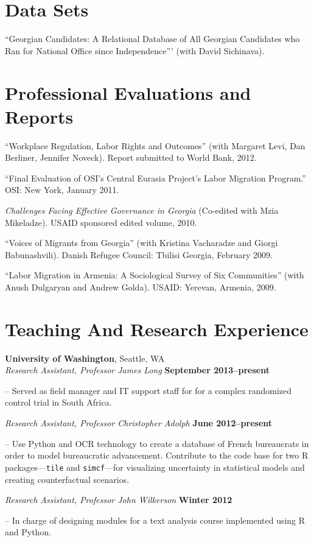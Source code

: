 \documentclass[margin,line]{res}
\newenvironment{list1}{
  \begin{list}{\ding{113}}{%
      \setlength{\itemsep}{0in}
      \setlength{\parsep}{0in} \setlength{\parskip}{0in}
      \setlength{\topsep}{0in} \setlength{\partopsep}{0in} 
      \setlength{\leftmargin}{0.17in}}}{\end{list}}
\begin{document}
{\begin{resume}
\section{\sc Data Sets}
``Georgian Candidates: A Relational Database of All Georgian
Candidates who Ran for National Office since Independence''' (with
David Sichinava).

\section{\sc Professional Evaluations and Reports}

 ``Workplace Regulation, Labor Rights and Outcomes'' (with Margaret Levi, Dan Berliner, Jennifer Noveck). Report submitted to World Bank,  2012. 

``Final Evaluation of OSI's Central Eurasia Project's Labor Migration
Program.'' OSI: New York, January 2011. 

\emph{Challenges Facing Effective Governance in Georgia} (Co-edited with Mzia Mikeladze). USAID sponsored edited volume, 2010.  

``Voices of Migrants
from Georgia''  (with Kristina Vacharadze and Giorgi Babunashvili).
Danish Refugee Council: Tbilisi Georgia, February 2009.

``Labor Migration in Armenia:
A Sociological Survey of Six Communities'' (with Anush Dulgaryan and
Andrew Golda).  USAID: Yerevan, Armenia, 2009.


\section{\sc Teaching And Research Experience}
{\bf University of Washington}, Seattle, WA \\
{\em Research Assistant, Professor James Long} \hfill {\bf September 2013--present}\\
\vspace{-.1in}
\begin{list1}
\item[]-- Served as field manager and IT support staff for for a complex randomized control trial in South Africa.
\end{list1}
{\em Research Assistant, Professor Christopher Adolph} \hfill {\bf June 2012--present}\\
\vspace{-.1in}
\begin{list1}
\item[]-- Use Python and OCR technology to create a database of French
bureaucrats in order to model bureaucratic advancement. Contribute to the code base for two R packages---\texttt{tile} and \texttt{simcf}---for visualizing uncertainty in
statistical models and creating counterfactual scenarios. 
\end{list1}
{\em Research Assistant, Professor John Wilkerson} \hfill {\bf Winter 2012}\\
\vspace{-.1in}
\begin{list1}
\item[]-- In charge of designing modules for a text analysis course implemented using R
and Python. 
\end{list1}


\end{resume}}
\end{document}
